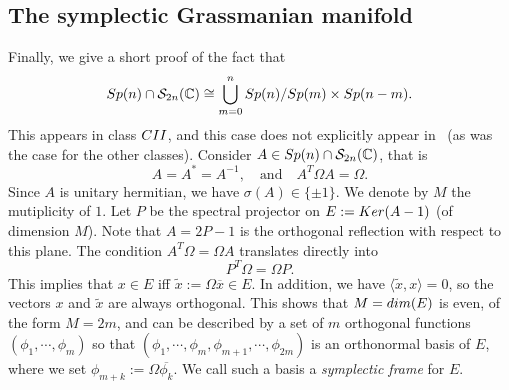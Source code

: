 \documentclass[11pt]{amsart}
\numberwithin{equation}{section} %
\newcommand\1{{\mathds 1}}
\def\C{{\mathbb C}}
\def\cS{{\mathcal S}}
\def\rCII{{\rm CII}}
\def\Sp{{\rm Sp}}
\def\Ker{{\rm Ker }}
\def\dim{{\rm dim }}
\begin{document}
\subsection{The symplectic Grassmanian manifold \label{app:symp_grass}}
Finally, we give a short proof of the fact that
 $$
    \Sp(n) \cap \cS_{2n}(\C) \cong \bigcup_{m=0}^n \Sp(n) / \Sp(m) \times \Sp(n-m).
$$
This appears in class $\rCII$, and this case does not explicitly appear in~\cite{GonMonPer-22} (as was the case for the other classes). Consider $A \in \Sp(n) \cap \cS_{2n}(\C)$, that is
\[
    A = A^*  =A^{-1}, \quad \text{and} \quad A^T \Omega A = \Omega.
\]
Since $A$ is unitary hermitian, we have $\sigma(A) \in \{ \pm 1\}$. We denote by $M$ the mutiplicity of $1$. Let $P$ be the spectral projector on $E := \Ker(A - 1)$ (of dimension $M$). Note that $A = 2 P - 1$ is the orthogonal reflection with respect to this plane. The condition $A^T \Omega = \Omega A$ translates directly into
\begin{equation} \label{eq:symplectic_projector}
    P^T \Omega = \Omega P.
\end{equation}
This implies that $x \in E$ iff $\widetilde{x} := \Omega \overline{x} \in E$. In addition, we have $\langle \widetilde{x}, x \rangle = 0$, so the vectors $x$ and $\tilde{x}$ are always orthogonal. This shows that $M =\dim(E)$ is even, of the form $M = 2m$, and can be described by a set of $m$ orthogonal functions $(\phi_1, \cdots, \phi_m)$ so that $(\phi_1, \cdots, \phi_m, \phi_{m+1}, \cdots, \phi_{2m})$ is an orthonormal basis of $E$, where we set $\phi_{m+k} := \Omega \overline{\phi_k}$. We call such a basis a {\em symplectic frame} for $E$.

\medskip
\end{document}
